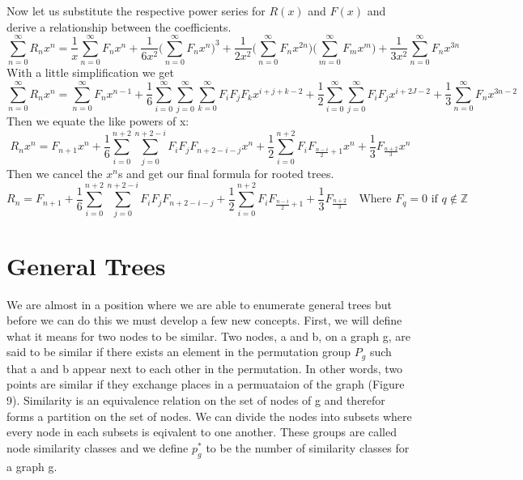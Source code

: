 \documentclass{article}
\begin{document}
 Now let us substitute the respective power series for \(R(x)\) and \(F(x)\) and derive a relationship between the coefficients.
\begin{equation}
\sum_{n=0}^\infty R_nx^n= \frac{1}{x}\sum_{n=0}^\infty F_nx^n +\frac{1}{6x^2}\Big(\sum_{n=0}^\infty F_nx^n \Big)^3+\frac{1}{2x^2}\Big(\sum_{n=0}^\infty F_nx^{2n} \Big)\Big(\sum_{m=0}^\infty F_mx^m \Big) +\frac{1}{3x^2}\sum_{n=0}^\infty F_nx^{3n}
\end{equation}
With a little simplification we get\begin{equation}
\sum_{n=0}^\infty R_nx^n= \sum_{n=0}^\infty F_nx^{n-1} +\frac{1}{6}\sum_{i=0}^\infty \sum_{j=0}^\infty \sum_{k=0}^\infty  F_iF_jF_kx^{i+j+k-2}+\frac{1}{2}\sum_{i=0}^\infty \sum_{j=0}^\infty F_iF_jx^{i+2J-2} +\frac{1}{3}\sum_{n=0}^\infty F_nx^{3n-2}
\end{equation}
Then we equate the like powers of x:
\begin{equation}
 R_nx^n=  F_{n+1}x^n +\frac{1}{6}\sum_{i=0}^{n+2} \sum_{j=0}^{n+2-i} F_iF_jF_{n+2-i-j}x^n+\frac{1}{2}\sum_{i=0}^{n+2}  F_iF_{\frac{n-i}{2}+1}x^n+\frac{1}{3} F_{\frac{n+2}{3}}x^n
\end{equation}
Then we cancel the \(x^n\)s and get our final formula for rooted trees.
\begin{equation}
 R_n=  F_{n+1} +\frac{1}{6}\sum_{i=0}^{n+2} \sum_{j=0}^{n+2-i} F_iF_jF_{n+2-i-j}+\frac{1}{2}\sum_{i=0}^{n+2}  F_iF_{\frac{n-i}{2}+1}+\frac{1}{3} F_{\frac{n+2}{3}} \quad \text{Where } F_q=0 \text{ if } q \notin \mathbb{Z}
\end{equation}

\section{General Trees}
We are almost in a position where we are able to enumerate general trees but before we can do this we must develop a few new concepts. 
	First, we will define what it means for two nodes to be similar. Two nodes, a and b, on a graph g, are said to be similar if there exists an element in the permutation group \(P_g\) such that a and b appear next to each other in the permutation. In other words, two points are similar if they exchange places in a permuataion of the graph (Figure 9). Similarity is an equivalence relation on the set of nodes of g and therefor forms a partition on the set of nodes. We can divide the nodes into subsets where every node in each subsets is eqivalent to one another. These groups are called node similarity classes and we define \(p_g^*\) to be the number of similarity classes for a graph g. 
\end{document}
